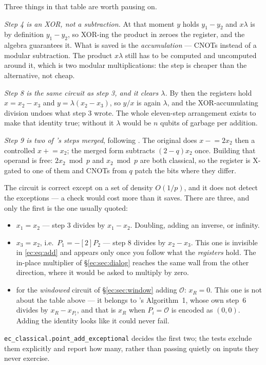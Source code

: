 \documentclass[11pt]{article}
\newcommand{\code}[1]{\texttt{#1}}
\theoremstyle{plain}
\theoremstyle{remark}
\begin{document}
\noindent
Three things in that table are worth pausing on.

\emph{Step 4 is an XOR, not a subtraction.} At that moment $y$ holds $y_1-y_2$ and $x\lambda$ is by
definition $y_1-y_2$, so XOR-ing the product in zeroes the register, and the algebra guarantees it.
What is saved is the \emph{accumulation} --- CNOTs instead of a modular subtraction. The product
$x\lambda$ still has to be computed and uncomputed around it, which is two modular multiplications:
the step is cheaper than the alternative, not cheap.

\emph{Step 8 is the same circuit as step 3, and it \emph{clears} $\lambda$.} By then the registers
hold $x=x_2-x_3$ and $y=\lambda(x_2-x_3)$, so $y/x$ is again $\lambda$, and the XOR-accumulating
division undoes what step 3 wrote. The whole eleven-step arrangement exists to make that identity
true; without it $\lambda$ would be $n$ qubits of garbage per addition.

\emph{Step 9 is two of \cite{ec:hjnrs20}'s steps merged}, following \cite{ec:kim26}. The original
does $x\mathrel{-}=2x_2$ then a controlled $x\mathrel{+}=x_2$; the merged form subtracts
$(2-q)x_2$ once. Building that operand is free: $2x_2\bmod p$ and $x_2\bmod p$ are both classical,
so the register is X-gated to one of them and CNOTs from $q$ patch the bits where they differ.

\begin{warnbox}[title={Three exceptional cases, not one}]
The circuit is correct except on a set of density $O(1/p)$, and it does not detect the exceptions
--- a check would cost more than it saves. There are three, and only the first is the one usually
quoted:
\begin{itemize}\setlength\itemsep{1pt}
\item $x_1=x_2$ --- step 3 divides by $x_1-x_2$. Doubling, adding an inverse, or infinity.
\item $x_3=x_2$, i.e.\ $P_1=-[2]P_2$ --- step 8 divides by $x_2-x_3$. This one is invisible in
\eqref{ec:eq:add} and appears only once you follow what the \emph{registers} hold. The in-place
multiplier of \S\ref{ec:sec:dialog} reaches the same wall from the other direction, where it would
be asked to multiply by zero.
\item for the \emph{windowed} circuit of \S\ref{ec:sec:window} adding $\mathcal O$: $x_R=0$. This
one is not about the table above --- it belongs to \cite{ec:schrott26}'s Algorithm~1, whose own
step~6 divides by $x_R-x_{P_i}$, and that is $x_R$ when $P_i=\mathcal O$ is encoded as $(0,0)$.
Adding the identity looks like it could never fail.
\end{itemize}
\code{ec\_classical.point\_add\_exceptional} decides the first two; the tests exclude them
explicitly and report how many, rather than passing quietly on inputs they never exercise.
\end{warnbox}
\end{document}

